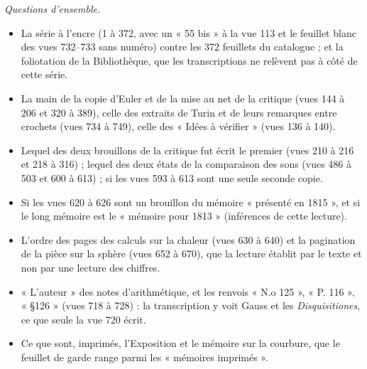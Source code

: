 \documentclass[11pt,a4paper]{article}
\begin{document}
\emph{Questions d'ensemble.}
\begin{itemize}
\item La série à l'encre (1 à 372, avec un « 55 bis » à la vue 113 et le feuillet
blanc des vues 732--733 sans numéro) contre les 372 feuillets du catalogue ; et la
foliotation de la Bibliothèque, que les transcriptions ne relèvent pas à côté de
cette série.
\item La main de la copie d'Euler et de la mise au net de la critique (vues 144 à
206 et 320 à 389), celle des extraits de Turin et de leurs remarques entre
crochets (vues 734 à 749), celle des « Idées à vérifier » (vues 136 à 140).
\item Lequel des deux brouillons de la critique fut écrit le premier (vues 210 à
216 et 218 à 316) ; lequel des deux états de la comparaison des sons (vues 486 à
503 et 600 à 613) ; si les vues 593 à 613 sont une seule seconde copie.
\item Si les vues 620 à 626 sont un brouillon du mémoire « présenté en 1815 », et
si le long mémoire est le « mémoire pour 1813 » (inférences de cette lecture).
\item L'ordre des pages des calculs sur la chaleur (vues 630 à 640) et la
pagination de la pièce sur la sphère (vues 652 à 670), que la lecture établit par
le texte et non par une lecture des chiffres.
\item « L'auteur » des notes d'arithmétique, et les renvois « N.o 125 »,
« P. 116 », « §126 » (vues 718 à 728) : la transcription y voit Gauss et les
\emph{Disquisitiones}, ce que seule la vue 720 écrit.
\item Ce que sont, imprimés, l'Exposition et le mémoire sur la courbure, que le
feuillet de garde range parmi les « mémoires imprimés ».
\end{itemize}
\end{document}

